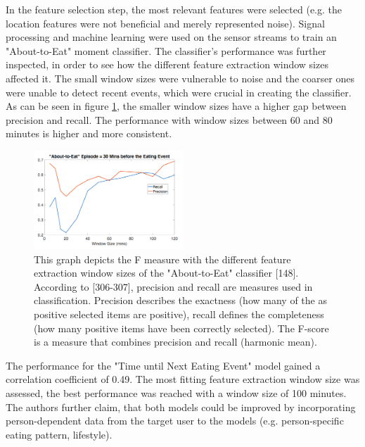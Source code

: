 In the feature selection step, the most relevant features were selected (e.g. the location features were not beneficial and merely represented noise). Signal processing and machine learning were used on the sensor streams to train an "About-to-Eat" moment classifier. The classifier's performance was further inspected, in order to see how the different feature extraction window sizes affected it. The small window sizes were vulnerable to noise and the coarser ones were unable to detect recent events, which were crucial in creating the classifier. As can be seen in figure \ref{figure:windowSize}, the smaller window sizes have a higher gap between precision and recall. The performance with window sizes between 60 and 80 minutes is higher and more consistent.

\begin{figure}[h]
  \centering
  \includegraphics[width=0.5\textwidth]{./images/windowSizePerformance.png}
  \caption{This graph depicts the F measure with the different feature extraction window sizes of the "About-to-Eat" classifier \autocite{AboutToEat2016Rahman}[148]. According to \textcite{han2011data}[306-307], precision and recall are measures used in classification. Precision describes the exactness (how many of the as positive selected items are positive), recall defines the completeness (how many positive items have been correctly selected). The F-score is a measure that combines precision and recall (harmonic mean).}
  \label{figure:windowSize}
\end{figure}






The performance for the "Time until Next Eating Event" model gained a correlation coefficient of 0.49. The most fitting feature extraction window size was assessed, the best performance was reached with a window size of 100 minutes. The authors further claim, that both models could be improved by incorporating person-dependent data from the target user to the models (e.g. person-specific eating pattern, lifestyle).



